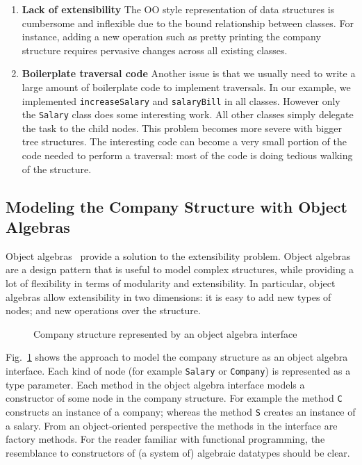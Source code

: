 \begin{enumerate}

\item {\bf Lack of extensibility} The OO style
  representation of data structures is cumbersome and
  inflexible due to the bound relationship between classes. For
  instance, adding a new operation such as pretty
  printing the company structure requires pervasive changes across all
  existing classes.

\item {\bf Boilerplate traversal code} Another issue is that we
  usually need to write a large amount of boilerplate code to
  implement traversals. In our example, we implemented
  \lstinline{increaseSalary} and \lstinline{salaryBill} in all
  classes. However only the \lstinline{Salary} class does some
  interesting work. All other classes simply delegate the task to the
  child nodes. This problem becomes more severe with bigger tree
  structures. The interesting code can become a very small portion of
  the code needed to perform a traversal: most of the code is doing
  tedious walking of the structure.

\end{enumerate}

\subsection{Modeling the Company Structure with Object Algebras}

Object algebras~\cite{bruno12oa} provide a solution to the extensibility problem.
Object algebras are a design pattern that is useful to model complex
structures, while providing a lot of flexibility in terms of
modularity and extensibility. In particular, object algebras allow
extensibility in two dimensions: it is easy to add new types of
nodes; and new operations over the structure.

\begin{figure}[tb]
\vspace{-.1in}
\caption{Company structure represented by an object algebra interface}
\label{syb_tree}
\end{figure}

Fig.~\ref{syb_tree} shows the approach to model the company
structure as an object algebra interface. Each kind of node (for
example \lstinline{Salary} or \lstinline{Company}) is represented as a
type parameter. Each method in the object algebra interface models a
constructor of some node in the company structure. For example the
method \lstinline{C} constructs an instance of a company; whereas the
method \lstinline{S} creates an instance of a salary. From an
object-oriented perspective the methods in the interface are factory
methods. For the reader familiar with functional programming, the
resemblance to constructors of  (a system of) algebraic datatypes should be clear.


